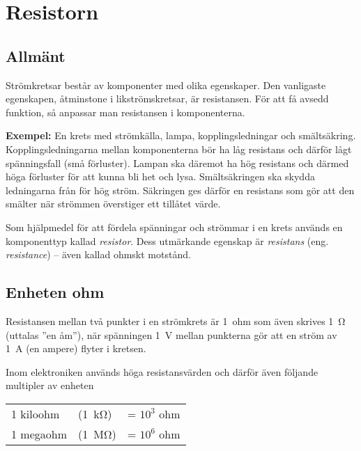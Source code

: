 \section{Resistorn}
\label{sec:resistorn}

\subsection{Allmänt}

Strömkretsar består av komponenter med olika egenskaper.
Den vanligaste egenskapen, åtminstone i likströmskretsar, är resistansen.
För att få avsedd funktion, så anpassar man resistansen i komponenterna.

\textbf{Exempel:} En krets med strömkälla, lampa, kopplingsledningar och smältsäkring.
Kopplingsledningarna mellan komponenterna bör ha låg resistans och därför lågt
spänningsfall (små förluster).
Lampan ska däremot ha hög resistans och därmed höga förluster för att kunna bli
het och lysa.
Smältsäkringen ska skydda ledningarna från för hög ström.
Säkringen ges därför en resistans som gör att den smälter när strömmen
överstiger ett tillåtet värde.

Som hjälpmedel för att fördela spänningar och strömmar i en krets används
en komponenttyp kallad \emph{resistor}.
Dess utmärkande egenskap är \emph{resistans} (eng. \emph{resistance}) --
även kallad ohmskt motstånd.

\subsection{Enheten ohm}
\label{enheten_ohm}


Resistansen mellan två punkter i en strömkrets är 1~ohm som även skrives
\qty{1}{\ohm} (uttalas ''en åm''), när spänningen \qty{1}{\volt} mellan
punkterna gör att en ström av \qty{1}{\ampere} (en ampere) flyter i kretsen.

Inom elektroniken används höga resistansvärden och därför även följande
multipler av enheten

\begin{center}
\begin{tabular}{lll}
  1 kiloohm & (\qty{1}{\kilo\ohm}) & = \(10^3\) ohm \\
  1 megaohm & (\qty{1}{\mega\ohm}) & = \(10^6\) ohm \\
\end{tabular}
\end{center}

